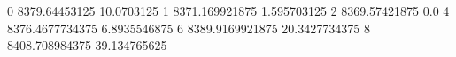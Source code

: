 0 8379.64453125 10.0703125
1 8371.169921875 1.595703125
2 8369.57421875 0.0
4 8376.4677734375 6.8935546875
6 8389.9169921875 20.3427734375
8 8408.708984375 39.134765625
